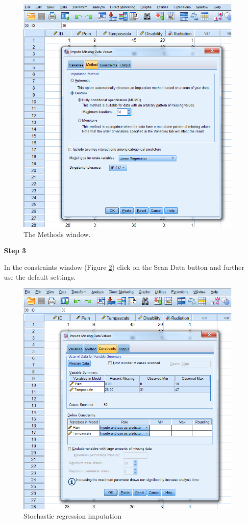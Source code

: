 \documentclass[]{book}
\begin{document}
\begin{figure}

{\centering \includegraphics[width=0.7\linewidth]{images/fig3.19} 

}

\caption{The Methods window.}\label{fig:fig3-19}
\end{figure}

\textbf{Step 3}

In the constraints window (Figure \ref{fig:fig3-20}) click on the Scan
Data button and further use the default settings.

\begin{figure}

{\centering \includegraphics[width=0.7\linewidth]{images/fig3.20} 

}

\caption{Stochastic regression imputation}\label{fig:fig3-20}
\end{figure}
\end{document}
